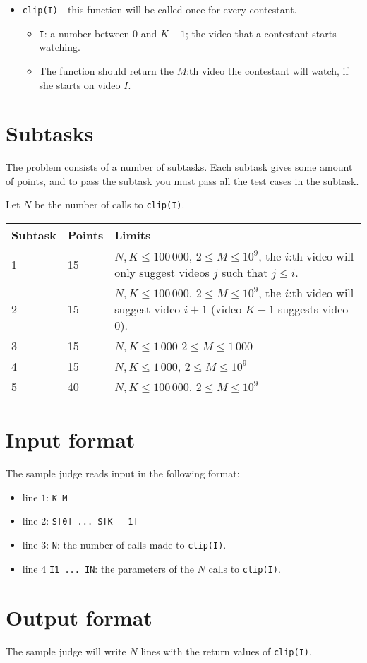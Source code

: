 \begin{itemize}
  \item \texttt{clip(I)} - this function will be called once for every contestant.
  \begin{itemize}
    \item \texttt{I}: a number between $0$ and $K - 1$; the video that a contestant starts watching.
		\item The function should return the $M$:th video the contestant will watch, if she starts on video $I$.
  \end{itemize}
\end{itemize}

\section*{Subtasks}
The problem consists of a number of subtasks. Each subtask gives some amount of points, and to pass
the subtask you must pass all the test cases in the subtask.

Let $N$ be the number of calls to \texttt{clip(I)}.
\begin{tabular}{|l|l|l|}
  \hline
  \textbf{Subtask} & \textbf{Points} & \textbf{Limits} \\ \hline
  1 & 15 & $N, K \le 100\,000$, $2 \le M \le 10^9$, the $i$:th video will only suggest videos $j$ such that $j \le i$. \\ \hline
  2 & 15 & $N, K \le 100\,000$, $2 \le M \le 10^9$, the $i$:th video will suggest video $i + 1$ (video $K - 1$ suggests video 0). \\ \hline
  3 & 15 & $N, K \le 1\,000$ $2 \le M \le 1\,000$ \\ \hline
  4 & 15 & $N, K \le 1\,000$, $2 \le M \le 10^9$ \\ \hline
  5 & 40 & $N, K \le 100\,000$, $2 \le M \le 10^9$ \\ \hline
\end{tabular}

\section*{Input format}
The sample judge reads input in the following format:

\begin{itemize}
  \item line $1$: \texttt{K M}
  \item line $2$: \texttt{S[0] ... S[K - 1]}
  \item line $3$: \texttt{N}: the number of calls made to \texttt{clip(I)}.
  \item line $4$ \texttt{I1 ... IN}: the parameters of the $N$ calls to \texttt{clip(I)}.
\end{itemize}

\section*{Output format}
The sample judge will write $N$ lines with the return values of \texttt{clip(I)}.
